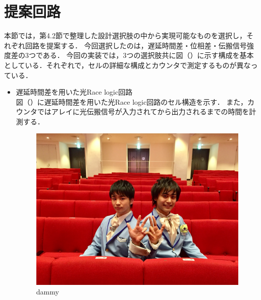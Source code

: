 \section{提案回路}
本節では，第4.2節で整理した設計選択肢の中から実現可能なものを選択し，それぞれ回路を提案する．
今回選択したのは，遅延時間差・位相差・伝搬信号強度差の3つである．
今回の実装では，3つの選択肢共に図（）に示す構成を基本としている．それぞれで，セルの詳細な構成とカウンタで測定するものが異なっている．

\begin{itemize}
\item 遅延時間差を用いた光Race logic回路\\
図（）に遅延時間差を用いた光Race logic回路のセル構造を示す．
また，カウンタではアレイに光伝搬信号が入力されてから出力されるまでの時間を計測する．
\begin{figure}[t!]
\begin{center}
\includegraphics[keepaspectratio,scale=0.05]{fig/dammy.jpg}
\caption{dammy}
\label{dammy}
\end{center}
\end{figure}


\end{itemize}
